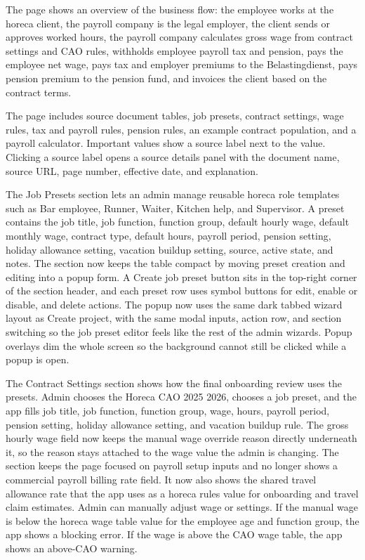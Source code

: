 \documentclass[11pt]{article}
\begin{document}
The page shows an overview of the business flow: the employee works at the horeca client, the payroll company is the legal employer, the client sends or approves worked hours, the payroll company calculates gross wage from contract settings and CAO rules, withholds employee payroll tax and pension, pays the employee net wage, pays tax and employer premiums to the Belastingdienst, pays pension premium to the pension fund, and invoices the client based on the contract terms.

The page includes source document tables, job presets, contract settings, wage rules, tax and payroll rules, pension rules, an example contract population, and a payroll calculator. Important values show a source label next to the value. Clicking a source label opens a source details panel with the document name, source URL, page number, effective date, and explanation.

The Job Presets section lets an admin manage reusable horeca role templates such as Bar employee, Runner, Waiter, Kitchen help, and Supervisor. A preset contains the job title, job function, function group, default hourly wage, default monthly wage, contract type, default hours, payroll period, pension setting, holiday allowance setting, vacation buildup setting, source, active state, and notes. The section now keeps the table compact by moving preset creation and editing into a popup form. A Create job preset button sits in the top-right corner of the section header, and each preset row uses symbol buttons for edit, enable or disable, and delete actions. The popup now uses the same dark tabbed wizard layout as Create project, with the same modal inputs, action row, and section switching so the job preset editor feels like the rest of the admin wizards. Popup overlays dim the whole screen so the background cannot still be clicked while a popup is open.

The Contract Settings section shows how the final onboarding review uses the presets. Admin chooses the Horeca CAO 2025 2026, chooses a job preset, and the app fills job title, job function, function group, wage, hours, payroll period, pension setting, holiday allowance setting, and vacation buildup rule. The gross hourly wage field now keeps the manual wage override reason directly underneath it, so the reason stays attached to the wage value the admin is changing. The section keeps the page focused on payroll setup inputs and no longer shows a commercial payroll billing rate field. It now also shows the shared travel allowance rate that the app uses as a horeca rules value for onboarding and travel claim estimates. Admin can manually adjust wage or settings. If the manual wage is below the horeca wage table value for the employee age and function group, the app shows a blocking error. If the wage is above the CAO wage table, the app shows an above-CAO warning.
\end{document}
